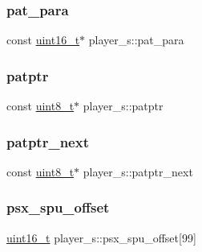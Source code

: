 \mbox{\label{structplayer__s_a569ee260a2aa80ad84e74e93fd1364c1}} 
\subsubsection{\texorpdfstring{pat\+\_\+para}{pat\_para}}
{\footnotesize\ttfamily const \hyperlink{inttypes_8h_a273cf69d639a59973b6019625df33e30}{uint16\+\_\+t}$\ast$ player\+\_\+s\+::pat\+\_\+para}

\mbox{\label{structplayer__s_ae0fa290b22546b4b5fc8e97ea99dd026}} 
\subsubsection{\texorpdfstring{patptr}{patptr}}
{\footnotesize\ttfamily const \hyperlink{inttypes_8h_aba7bc1797add20fe3efdf37ced1182c5}{uint8\+\_\+t}$\ast$ player\+\_\+s\+::patptr}

\mbox{\label{structplayer__s_ad33724d51fd353bc9d75aef77c6d9e7c}} 
\subsubsection{\texorpdfstring{patptr\+\_\+next}{patptr\_next}}
{\footnotesize\ttfamily const \hyperlink{inttypes_8h_aba7bc1797add20fe3efdf37ced1182c5}{uint8\+\_\+t}$\ast$ player\+\_\+s\+::patptr\+\_\+next}

\mbox{\label{structplayer__s_af3c154d2cbd1c92554e481bdf2e99046}} 
\subsubsection{\texorpdfstring{psx\+\_\+spu\+\_\+offset}{psx\_spu\_offset}}
{\footnotesize\ttfamily \hyperlink{inttypes_8h_a273cf69d639a59973b6019625df33e30}{uint16\+\_\+t} player\+\_\+s\+::psx\+\_\+spu\+\_\+offset\mbox{[}99\mbox{]}}

